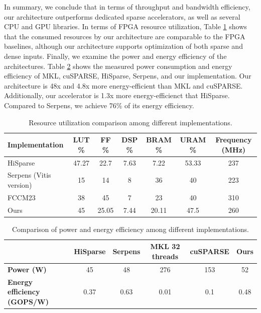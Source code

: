 \documentclass[manuscript,screen,review]{acmart}
\begin{document}
In summary, we conclude that in terms of throughput and bandwidth efficiency, our architecture outperforms dedicated sparse accelerators, as well as several CPU and GPU libraries. In terms of FPGA resource utilization, Table \ref{resource_util} shows that the consumed resources by our architecture are comparable to the FPGA baselines, although our architecture supports optimization of both sparse and dense inputs. Finally, we examine the power and energy efficiency of the architectures. Table \ref{power_energy_efficiency}
shows the measured power consumption and energy efficiency of MKL, cuSPARSE, HiSparse, Serpens, and our implementation. Our architecture is 48x and
4.8x more energy-efficient than MKL and cuSPARSE. Additionally, our accelerator is 1.3x more energy-efficienct that HiSparse. Compared to Serpens, we achieve 76\% of its energy efficiency. 

\begin{table}[h!]
	\centering
	\begin{tabular}{|l|c|c|c|c|c|c|}
		\hline
		\textbf{Implementation} & \textbf{LUT \%} & \textbf{FF \%} & \textbf{DSP \%} & \textbf{BRAM \%} & \textbf{URAM \%} & \textbf{Frequency (MHz)} \\
		\hline
		HiSparse & 47.27 & 22.7 & 7.63 & 7.22 & 53.33 & 237 \\
		Serpens (Vitis version) & 15 & 14 & 8 & 36 & 40 & 223 \\
		FCCM23 & 38 & 45 & 7 & 23 & 40 & 310 \\
		Ours & 45 & 25.05 & 7.44 & 20.11 & 47.5 & 260 \\
		\hline
	\end{tabular}
	\caption{Resource utilization comparison among different implementations.}
	\label{resource_util}
\end{table}

\begin{table}[h!]
	\centering
	\begin{tabular}{|l|c|c|c|c|c|}
		\hline
		\textbf{} & \textbf{HiSparse} & \textbf{Serpens} & \textbf{MKL 32 threads} & \textbf{cuSPARSE} & \textbf{Ours} \\
		\hline
		\textbf{Power (W)} & 45 & 48 & 276 & 153 & 52 \\
		\textbf{Energy efficiency (GOPS/W)} & 0.37 & 0.63 & 0.01 & 0.1 & 0.48 \\
		\hline
	\end{tabular}
	\caption{Comparison of power and energy efficiency among different implementations.}
	\label{power_energy_efficiency}
\end{table}
\end{document}
